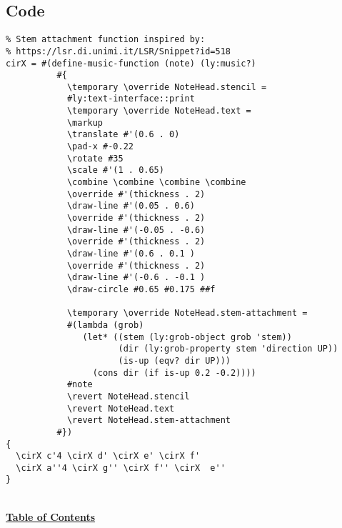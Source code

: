 \subsection{Code}
\begin{verbatim}
% Stem attachment function inspired by:
% https://lsr.di.unimi.it/LSR/Snippet?id=518
cirX = #(define-music-function (note) (ly:music?)
          #{
            \temporary \override NoteHead.stencil =
            #ly:text-interface::print
            \temporary \override NoteHead.text =
            \markup
            \translate #'(0.6 . 0)
            \pad-x #-0.22
            \rotate #35
            \scale #'(1 . 0.65)
            \combine \combine \combine \combine
            \override #'(thickness . 2)
            \draw-line #'(0.05 . 0.6)
            \override #'(thickness . 2)
            \draw-line #'(-0.05 . -0.6)
            \override #'(thickness . 2)
            \draw-line #'(0.6 . 0.1 )
            \override #'(thickness . 2)
            \draw-line #'(-0.6 . -0.1 )
            \draw-circle #0.65 #0.175 ##f

            \temporary \override NoteHead.stem-attachment =
            #(lambda (grob)
               (let* ((stem (ly:grob-object grob 'stem))
                      (dir (ly:grob-property stem 'direction UP))
                      (is-up (eqv? dir UP)))
                 (cons dir (if is-up 0.2 -0.2))))
            #note
            \revert NoteHead.stencil
            \revert NoteHead.text
            \revert NoteHead.stem-attachment
          #})
{
  \cirX c'4 \cirX d' \cirX e' \cirX f'
  \cirX a''4 \cirX g'' \cirX f'' \cirX  e''
}
\end{verbatim}
\hyperref[sec:toc]{\\ \textbf{Table of Contents}}

\vfill \break

